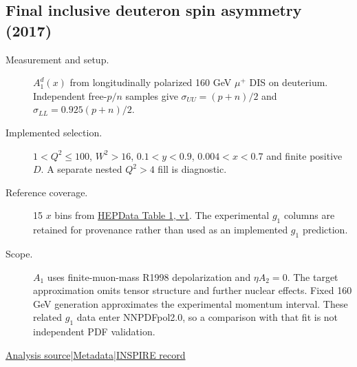 \documentclass[11pt,a4paper]{article}
\newcommand{\id}[1]{{\small\texttt{\detokenize{#1}}}}
\begin{document}
\subsection{\texorpdfstring{Final inclusive deuteron spin asymmetry (2017)}{Final inclusive deuteron spin asymmetry (2017)}}
\id{COMPASS_2017_I1501480}\quad\cite{r1501480}
\begin{description}
\item[Measurement and setup.] $A_1^d(x)$ from longitudinally polarized 160 GeV $\mu^+$ DIS on deuterium. Independent free-$p/n$ samples give $\sigma_{UU}=(p+n)/2$ and $\sigma_{LL}=0.925(p+n)/2$.
\item[Implemented selection.] $1<Q^2\le100$, $W^2>16$, $0.1<y<0.9$, $0.004<x<0.7$ and finite positive $D$. A separate nested $Q^2>4$ fill is diagnostic.
\item[Reference coverage.] 15 $x$ bins from \href{https://doi.org/10.17182/hepdata.78374.v1/t1}{HEPData Table 1, v1}. The experimental $g_1$ columns are retained for provenance rather than used as an implemented $g_1$ prediction.
\item[Scope.] $A_1$ uses finite-muon-mass R1998 depolarization and $\eta A_2=0$. The target approximation omits tensor structure and further nuclear effects. Fixed 160 GeV generation approximates the experimental momentum interval. These related $g_1$ data enter NNPDFpol2.0, so a comparison with that fit is not independent PDF validation.
\end{description}
{\small\href{https://github.com/apapaefs/HerwigPolarizedPheno/blob/105045bd757aaa6b217e87811dc5f9a22a8d1cef/analyses/rivet/dis/COMPASS_2017_I1501480.cc}{Analysis source}\quad|\quad\href{https://github.com/apapaefs/HerwigPolarizedPheno/blob/105045bd757aaa6b217e87811dc5f9a22a8d1cef/analyses/rivet/dis/COMPASS_2017_I1501480.info}{Metadata}\quad|\quad\href{https://inspirehep.net/literature/1501480}{INSPIRE record}}
\end{document}
